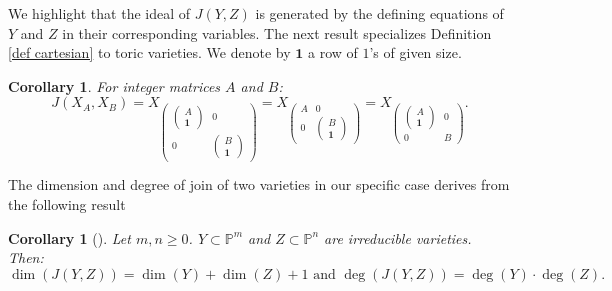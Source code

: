 \documentclass[11pt]{amsart}
\numberwithin{equation}{section}
\theoremstyle{plain}
\numberwithin{theorem}{section}
\newtheorem{corollary}[theorem]{Corollary}
\theoremstyle{definition}
\begin{document}
We highlight that the ideal of $J(Y,Z)$ is generated by the defining equations of $Y$ and $Z$ in their corresponding variables.
 The next result specializes Definition \ref{def cartesian} to toric varieties. We denote by $\textbf{1}$ a row of $1$'s of given size. 

\begin{corollary}\label{coro toric}
    For integer matrices $A$ and $B$: $$\displaystyle J(X_A,X_B)=X_{\left(\begin{smallmatrix}
    \left(\begin{smallmatrix}
        A\\\textbf{1}
    \end{smallmatrix}\right)&0\\0&\left(\begin{smallmatrix}
        B\\\textbf{1}
    \end{smallmatrix}\right)
\end{smallmatrix}\right)}=X_{\left(\begin{smallmatrix}
    A&0\\0&\left(\begin{smallmatrix}
        B\\\textbf{1}
    \end{smallmatrix}\right)
\end{smallmatrix}\right)}=X_{\left(\begin{smallmatrix}
    \left(\begin{smallmatrix}
        A\\\textbf{1}
    \end{smallmatrix}\right)&0\\0&B
\end{smallmatrix}\right)}.$$
\end{corollary}


\noindent The dimension and degree of join of two varieties in our specific case derives from the following result

\begin{corollary}[{\cite[Corollary 2.3]{aadlandsvik1987joins}}]\label{theo cartesian}
    Let $m,n\ge0$. $Y\subset\mathbb P^m$ and $Z\subset\mathbb P^n$ are irreducible varieties. Then:     $$\dim(J(Y,Z))=\dim(Y)+\dim(Z)+1\text{ and }\deg(J(Y,Z))=\deg(Y)\cdot\deg(Z).$$
\end{corollary}
\end{document}
